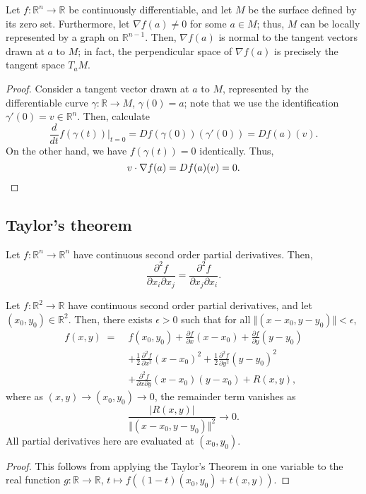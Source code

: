 \documentclass[11pt]{article}
\newcommand{\R}{\mathbb{R}}
\newcommand{\norm}[1]{\Vert #1 \Vert}
\newcommand{\dd}[2]{\frac{d #1}{d #2}}
\newcommand{\pp}[2]{\frac{\partial #1}{\partial #2}}
\newcommand{\ppn}[3][]{\frac{\partial^{#1} #2}{\partial #3^{#1}}}
\newcommand{\grad}{\nabla}
\theoremstyle{definition}
\theoremstyle{remark}
\numberwithin{equation}{section}
\begin{document}
    \begin{theorem}
        Let $f\colon \R^n \to \R$ be continuously differentiable, and let $M$ be the
        surface defined by its zero set. Furthermore, let $\grad{f}(a) \neq 0$ for
        some $a \in M$; thus, $M$ can be locally represented by a graph on $\R^{n -
        1}$. Then, $\grad{f}(a)$ is normal to the tangent vectors drawn at $a$ to
        $M$; in fact, the perpendicular space of $\grad{f}(a)$ is precisely the
        tangent space $T_aM$.
    \end{theorem}
    \begin{proof}
        Consider a tangent vector drawn at $a$ to $M$, represented by the
        differentiable curve $\gamma\colon \R \to M$, $\gamma(0) = a$; note that
        we use the identification $\gamma'(0) = v \in \R^n$. Then, calculate \[
            \dd{}{t}f(\gamma(t))\Big|_{t = 0} = Df(\gamma(0))(\gamma'(0)) = Df(a)(v).
        \] On the other hand, we have $f(\gamma(t)) = 0$ identically. Thus, \[
            v\cdot \grad{f}(a) = Df(a)(v) = 0. \qedhere
        \]
    \end{proof}

    \subsection{Taylor's theorem}
    
    \begin{theorem}
        Let $f\colon \R^n \to \R^n$ have continuous second order partial derivatives.
        Then, \[
            \frac{\partial^2 f}{\partial x_i\partial x_j} = \frac{\partial^2
            f}{\partial x_j\partial x_i}.
        \] 
    \end{theorem}

    \begin{theorem}
        Let $f\colon \R^2 \to \R$ have continuous second order partial derivatives,
        and let $(x_0, y_0) \in \R^2$. Then, there exists $\epsilon > 0$ such that
        for all $\norm{(x - x_0, y - y_0)} < \epsilon$, 
        \begin{align*}
            f(x, y) \;=\; &f(x_0, y_0) + \pp{f}{x}(x - x_0) + \pp{f}{y}(y - y_0) \\
            & + \frac{1}{2}\ppn[2]{f}{x}(x - x_0)^2 + \frac{1}{2}\ppn[2]{f}{y}(y -
            y_0)^2 \\
            & + \frac{\partial^2 f}{\partial x\partial y}(x - x_0)(y - x_0) + R(x,
            y),
        \end{align*}
        where as $(x, y) \to (x_0, y_0) \to 0$, the remainder term vanishes as \[
            \frac{|R(x, y)|}{\norm{(x - x_0, y - y_0)}^2} \to 0.
        \] All partial derivatives here are evaluated at $(x_0, y_0)$.
    \end{theorem}
    \begin{proof}
        This follows from applying the Taylor's Theorem in one variable to the real
        function $g\colon \R \to \R$, $t \mapsto f((1 - t)(x_0, y_0) + t(x, y))$.
    \end{proof}
\end{document}
